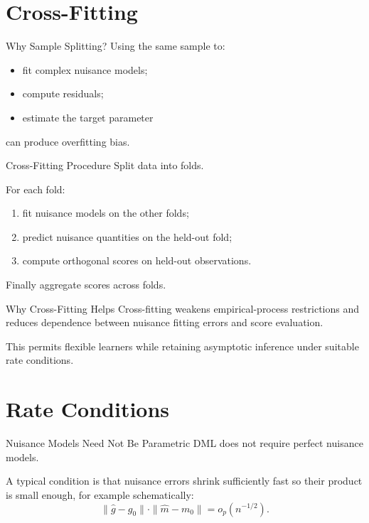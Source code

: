 \documentclass[aspectratio=169,11pt]{beamer}
\begin{document}
\section{Cross-Fitting}

\begin{frame}{Why Sample Splitting?}
Using the same sample to:
\begin{itemize}
\item fit complex nuisance models;
\item compute residuals;
\item estimate the target parameter
\end{itemize}
can produce overfitting bias.
\end{frame}

\begin{frame}{Cross-Fitting Procedure}
Split data into folds.

For each fold:
\begin{enumerate}
\item fit nuisance models on the other folds;
\item predict nuisance quantities on the held-out fold;
\item compute orthogonal scores on held-out observations.
\end{enumerate}

Finally aggregate scores across folds.
\end{frame}

\begin{frame}{Why Cross-Fitting Helps}
Cross-fitting weakens empirical-process restrictions and reduces dependence between nuisance fitting errors and score evaluation.

This permits flexible learners while retaining asymptotic inference under suitable rate conditions.
\end{frame}

\section{Rate Conditions}

\begin{frame}{Nuisance Models Need Not Be Parametric}
DML does not require perfect nuisance models.

A typical condition is that nuisance errors shrink sufficiently fast so their product is small enough, for example schematically:
\[
\|\widehat g-g_0\|
\cdot
\|\widehat m-m_0\|
=
o_p(n^{-1/2}).
\]
\end{frame}
\end{document}
